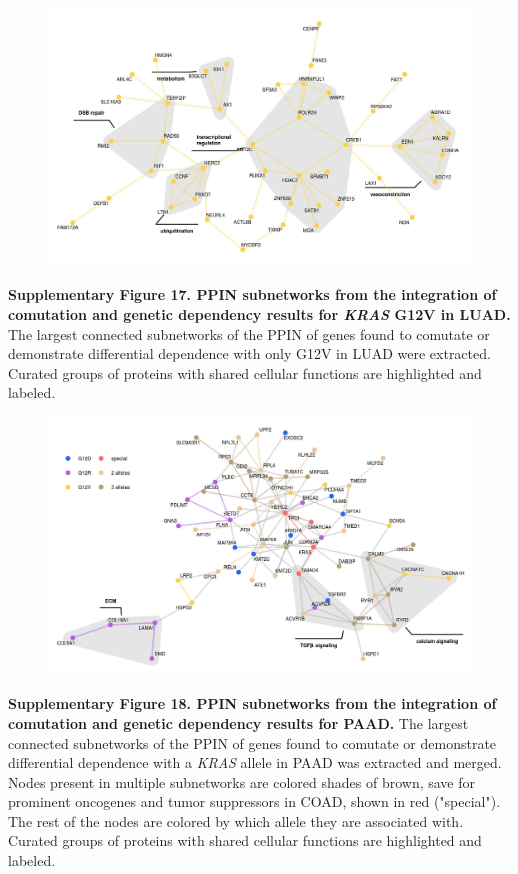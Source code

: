 \documentclass[english, 10pt, letterpaper]{article}
\newcommand{\KRAS}{\emph{KRAS}}
\begin{document}
\begin{figure}[h!]
\centering
\includegraphics[width=180mm]{figures/Supp_Fig_17.jpeg}
\label{sfig:luadG12V-integrated-ppin}
\end{figure}

\noindent \textbf{Supplementary Figure 17. PPIN subnetworks from the integration of comutation and genetic dependency results for \KRAS{} G12V in LUAD.}
The largest connected subnetworks of the PPIN of genes found to comutate or demonstrate differential dependence with only G12V in LUAD were extracted. Curated groups of proteins with shared cellular functions are highlighted and labeled.
\newpage


\begin{figure}[h!]
\centering
\includegraphics[width=180mm]{figures/Supp_Fig_18.jpeg}
\label{sfig:paad-integrated-ppin}
\end{figure}

\noindent \textbf{Supplementary Figure 18. PPIN subnetworks from the integration of comutation and genetic dependency results for PAAD.}
The largest connected subnetworks of the PPIN of genes found to comutate or demonstrate differential dependence with a \KRAS{} allele in PAAD was extracted and merged. Nodes present in multiple subnetworks are colored shades of brown, save for prominent oncogenes and tumor suppressors in COAD, shown in red ("special"). The rest of the nodes are colored by which allele they are associated with. Curated groups of proteins with shared cellular functions are highlighted and labeled.



\end{document}
